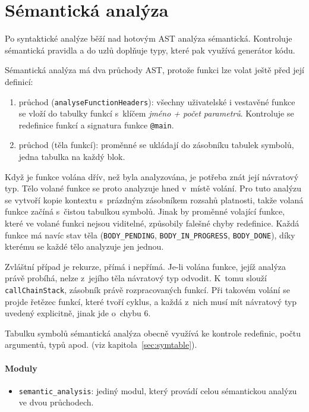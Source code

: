 \section{Sémantická analýza}
\label{sec:semantika}
\sloppy %

Po syntaktické analýze běží nad hotovým AST analýza sémantická. Kontroluje sémantická pravidla a do uzlů doplňuje typy, které pak využívá generátor kódu.

Sémantická analýza má dva průchody AST, protože funkci lze volat ještě před její definicí:
\begin{enumerate}
  \item průchod (\texttt{analyseFunctionHeaders}): všechny uživatelské i vestavěné funkce se vloží do tabulky funkcí s~klíčem \emph{jméno + počet parametrů}. Kontroluje se redefinice funkcí a signatura funkce \texttt{@main}.
  \item průchod (těla funkcí): proměnné se ukládají do zásobníku tabulek symbolů, jedna tabulka na každý blok.
\end{enumerate}

Když je funkce volána dřív, než byla analyzována, je potřeba znát její návratový typ. Tělo volané funkce se proto analyzuje hned v~místě volání. Pro tuto analýzu se vytvoří kopie kontextu s~prázdným zásobníkem rozsahů platnosti, takže volaná funkce začíná s~čistou tabulkou symbolů. Jinak by proměnné volající funkce, které ve volané funkci nejsou viditelné, způsobily falešné chyby redefinice. Každá funkce má navíc stav těla (\texttt{BODY\_PENDING}, \texttt{BODY\_IN\_PROGRESS}, \texttt{BODY\_DONE}), díky kterému se každé tělo analyzuje jen jednou.

Zvláštní případ je rekurze, přímá i nepřímá. Je-li volána funkce, jejíž analýza právě probíhá, nelze z~jejího těla návratový typ odvodit. K~tomu slouží \texttt{callChainStack}, zásobník právě rozpracovaných funkcí. Při takovém volání se projde řetězec funkcí, které tvoří cyklus, a každá z~nich musí mít návratový typ uvedený explicitně, jinak jde o~chybu 6.

Tabulku symbolů sémantická analýza obecně využívá ke kontrole redefinic, počtu argumentů, typů apod. (viz kapitola~\ref{sec:symtable}).

\paragraph{Moduly}
\begin{itemize}
  \item \texttt{semantic\_analysis}: jediný modul, který provádí celou sémantickou analýzu ve dvou průchodech.
\end{itemize}
\fussy
